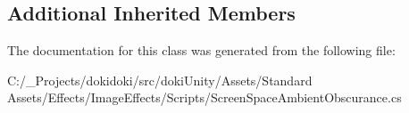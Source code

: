 \subsection*{Additional Inherited Members}


The documentation for this class was generated from the following file\+:\begin{DoxyCompactItemize}
\item 
C\+:/\+\_\+\+Projects/dokidoki/src/doki\+Unity/\+Assets/\+Standard Assets/\+Effects/\+Image\+Effects/\+Scripts/Screen\+Space\+Ambient\+Obscurance.\+cs\end{DoxyCompactItemize}
